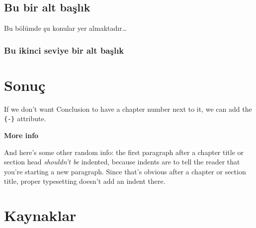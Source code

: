 \documentclass[12pt,twoside]{deuthesis}
\begin{document}
\hypertarget{bu-bir-alt-baux15flux131k}{%
\section{Bu bir alt başlık}\label{bu-bir-alt-baux15flux131k}}

Bu bölümde şu konular yer almaktadır\ldots{}

\hypertarget{bu-ikinci-seviye-bir-alt-baux15flux131k}{%
\subsection{Bu ikinci seviye bir alt başlık}\label{bu-ikinci-seviye-bir-alt-baux15flux131k}}

\hypertarget{sonuuxe7}{%
\chapter*{Sonuç}\label{sonuuxe7}}

If we don't want Conclusion to have a chapter number next to it, we can add the \texttt{\{-\}} attribute.

\textbf{More info}

And here's some other random info: the first paragraph after a chapter title or section head \emph{shouldn't be} indented, because indents are to tell the reader that you're starting a new paragraph. Since that's obvious after a chapter or section title, proper typesetting doesn't add an indent there.

\hypertarget{kaynaklar}{%
\chapter*{Kaynaklar}\label{kaynaklar}}

\end{document}
